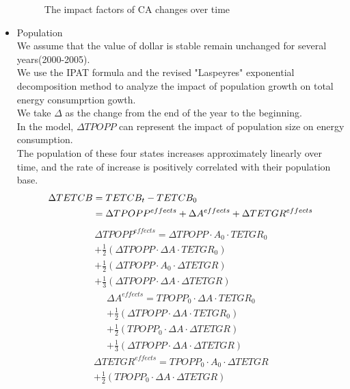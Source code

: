 \begin{itemize}
\begin{figure}[h]
     	\caption{The impact factors of CA changes over time}
		\label{fig:Industry}
	\end{figure}
	\item Population\\
		We assume that the value of dollar is stable remain unchanged for several years(2000-2005).\\
	We use the IPAT formula and the revised "Laspeyres" exponential decomposition method to analyze the impact of population growth on total energy consumprtion gowth.\cite{IPAT}\\
	We take $ \Delta $ as the change from the end of the year to the beginning.\\
	In the model, $ \Delta TPOPP$ can represent the impact of population size on energy consumption.\\
	The population of these four states increases approximately linearly over time, and the rate of increase is positively correlated with their population base.
	\begin{align}
	\Delta TETCB&=TETCB_{t}-TETCB_{0}\notag\\&=\Delta TPOPP^{effects}+\Delta A^{effects}+\Delta TETGR^{effects}
	\end{align}
	\setlength\multlinegap{4em}
	\setlength\multlinetaggap{8em}
	\begin{multline}
	\Delta TPOPP^{effects}=\Delta TPOPP\cdot A_{0}\cdot TETGR_{0}\\
	+\frac{1}{2}\left ( \Delta TPOPP\cdot \Delta A\cdot TETGR_{0} \right ) \\
	+\frac{1}{2}\left ( \Delta TPOPP\cdot A_{0}\cdot \Delta TETGR \right )\\
	+ \frac{1}{3}\left ( \Delta TPOPP\cdot \Delta A\cdot \Delta TETGR \right)
	\end{multline}
	\begin{multline}
	\Delta A^{effects}= TPOPP_{0}\cdot \Delta A\cdot TETGR_{0}\\
	+\frac{1}{2}\left ( \Delta TPOPP\cdot \Delta A\cdot TETGR_{0} \right ) \\
	+\frac{1}{2}\left ( TPOPP_{0}\cdot \Delta A\cdot \Delta TETGR \right )\\
	+\frac{1}{3}\left ( \Delta TPOPP\cdot \Delta A\cdot \Delta TETGR \right )
	\end{multline}
	\begin{multline}
	\Delta TETGR^{effects}= TPOPP_{0}\cdot A_{0}\cdot \Delta TETGR\\
	+\frac{1}{2}\left ( TPOPP_{0}\cdot \Delta A\cdot \Delta TETGR \right )\\

\end{multline}
\end{itemize}
